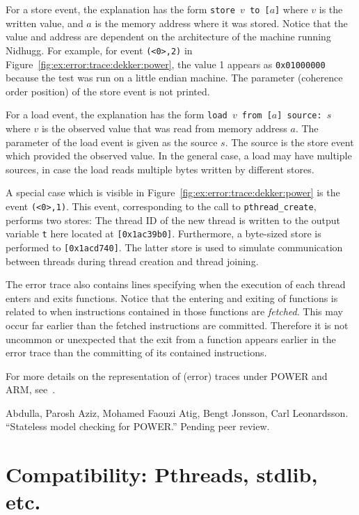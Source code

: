 \documentclass[a4paper]{article}
\begin{document}
For a store event, the explanation has the form
\texttt{store~$v$~to~[$a$]} where $v$ is the written value, and $a$ is
the memory address where it was stored. Notice that the value and
address are dependent on the architecture of the machine running
Nidhugg. For example, for event \texttt{(<0>,2)} in
Figure~\ref{fig:ex:error:trace:dekker:power}, the value 1 appears as
\texttt{0x01000000} because the test was run on a little endian
machine. The parameter (coherence order position) of the store event
is not printed.

For a load event, the explanation has the form
\texttt{load~$v$~from~[$a$]~source:~$s$} where $v$ is the observed
value that was read from memory address $a$. The parameter of the load
event is given as the source $s$. The source is the store event which
provided the observed value. In the general case, a load may have
multiple sources, in case the load reads multiple bytes written by
different stores.

A special case which is visible in
Figure~\ref{fig:ex:error:trace:dekker:power} is the event
\texttt{(<0>,1)}. This event, corresponding to the call to
\texttt{pthread\_create}, performs two stores: The thread ID of the
new thread is written to the output variable \texttt{t} here located
at \texttt{[0x1ac39b0]}. Furthermore, a byte-sized store is performed
to \texttt{[0x1acd740]}. The latter store is used to simulate
communication between threads during thread creation and thread
joining.

The error trace also contains lines specifying when the execution of
each thread enters and exits functions. Notice that the entering and
exiting of functions is related to when instructions contained in
those functions are \emph{fetched}. This may occur far earlier than
the fetched instructions are committed. Therefore it is not uncommon
or unexpected that the exit from a function appears earlier in the
error trace than the committing of its contained instructions.

For more details on the representation of (error) traces under POWER
and ARM, see~\cite{leonardssonRSMCPOWER}.

\begin{thebibliography}{99}
  Abdulla, Parosh Aziz, Mohamed Faouzi Atig, Bengt Jonsson, Carl Leonardsson. ``Stateless model checking for POWER.'' Pending peer review.
\end{thebibliography}

\section{Compatibility: Pthreads, stdlib, etc.}
\end{document}
